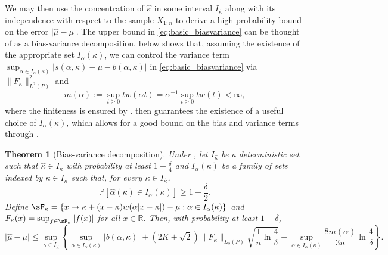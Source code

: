 \documentclass{article}
\theoremstyle{plain}
\newtheorem{theorem}{Theorem}[section]
\theoremstyle{definition}
\def\R{\mathbb{R}} %
\renewcommand{\Pr}{\mathbb{P}}
\begin{document}
We may then use the concentration of \( \widehat{\kappa }  \) in some interval \( I_{\widehat{\kappa } } \) along with its independence with respect to the sample \( X_{1:n} \) to derive a high-probability bound on the error \( \lvert \widehat{\mu } -\mu   \rvert  \). 
The upper bound in \eqref{eq:basic_biasvariance} can be thought of as a bias-variance decomposition. 
 below shows that, assuming the existence of the appropriate set $I_\alpha (\kappa )$, we can control the variance term $\sup_{\alpha \in I_\alpha (\kappa )}\lvert  s(\alpha, \kappa )-\mu-b(\alpha,\kappa )\rvert $ in \eqref{eq:basic_biasvariance} via $\|F_\kappa \|_{L^2(P)}^2$ and
\begin{equation}\label{eq:def_malpha}
  m(\alpha):=\sup_{t \ge 0} t w(\alpha t) = \alpha^{-1} \sup_{t \ge 0} t w(t) < \infty,
\end{equation}
where the finiteness is ensured by .  then guarantees the existence of a useful choice of $I_\alpha (\kappa )$, which allows for a good bound on the bias and variance terms through .

\begin{theorem}[Bias-variance decomposition]\label{theorem:bias_variance} Under , let \( I_{\widehat{\kappa } } \) be a deterministic set such that \( \widehat{\kappa } \in I_{\widehat{\kappa } }  \) with probability at least \( 1-\frac{\delta}{4} \) and $I_\alpha (\kappa )$ be a family of sets indexed by \( \kappa \in I_{\widehat{\kappa } } \) such that, for every \( \kappa \in I_{\widehat{\kappa } } \), 
	\begin{equation}
		\label{eq:alpha_in_alphak_whp}
    \Pr\left[\widehat{\alpha }(\kappa )\in I_\alpha (\kappa ) \right] \geq 1 - \frac{\delta}{2} .
	\end{equation}
	Define $\sF_\kappa  = \{ x \mapsto \kappa + (x-\kappa)w(\alpha |x-\kappa|)-\mu : \alpha  \in I_\alpha (\kappa )\}$ and $F_\kappa (x) = \sup_{f \in \sF_\kappa } |f(x)|$ for all $x \in \R$.
	Then, with probability at least $1-\delta$,
	\begin{equation}\label{eq:conclusion_bias_var}
    |\widehat{\mu} -\mu \vert \leq \sup_{\kappa \in I_{\widehat{\kappa } }} \left\{\sup_{\alpha \in I_\alpha (\kappa )} \vert b(\alpha,\kappa ) \vert + \left(2K+\sqrt{2}\right) \| F_\kappa  \|_{L_2(P)}\sqrt{\frac{1}{n} \ln \frac{4}{\delta}}+\sup_{\alpha \in I_\alpha (\kappa )}\frac{8 m(\alpha)}{3n}\ln \frac{4}{\delta }\right\}.
	\end{equation}
\end{theorem}
\end{document}
